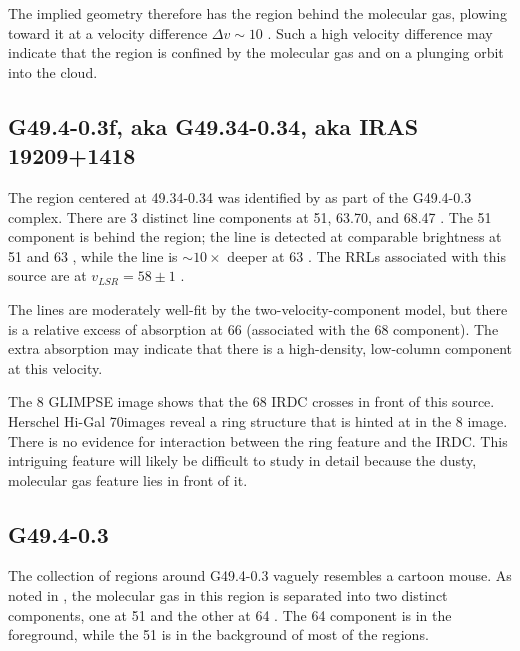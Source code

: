 The implied geometry therefore has the \hii region behind the molecular gas,
plowing toward it at a velocity difference $\Delta v \sim 10$ \kms.  Such a
high velocity difference may indicate that the \hii region is confined by the
molecular gas and on a plunging orbit into the cloud.

\subsection{G49.4-0.3f, aka G49.34-0.34, aka IRAS 19209+1418}
The \hii region centered at 49.34-0.34 was identified by \citet{Mehringer1994a}
as part of the G49.4-0.3 complex.  There are 3 distinct \formaldehyde line
components at 51, 63.70, and 68.47 \kms.  The 51 \kms component is behind the \hii
region; the \thirteenco line is detected at comparable brightness at 51 \kms
and 63 \kms, while the \formaldehyde \oneone line is $\sim10\times$ deeper at
63 \kms.  The RRLs associated with this source are at $v_{LSR}=58 \pm 1$ \kms.

The \formaldehyde lines are moderately well-fit by the two-velocity-component
model, but there is a relative excess of \twotwo absorption at 66 \kms
(associated with the 68 \kms component).  The extra absorption may indicate
that there is a high-density, low-column
component at this velocity.

The 8 \um GLIMPSE image shows that the 68 \kms IRDC crosses in front of this
source.  Herschel Hi-Gal 70\um images reveal a ring structure that is hinted at
in the 8 \um image.  There is no evidence for interaction between the ring
feature and the IRDC.  This intriguing feature will likely be difficult to
study in detail because the dusty, molecular gas feature lies in front of it.

\subsection{G49.4-0.3}
\label{sec:maus}
The collection of \hii regions around G49.4-0.3 vaguely resembles a cartoon
mouse.  As noted in \citet{Carpenter1998a}, the molecular gas in this region is
separated into two distinct components, one at 51 \kms and the other at 64
\kms.  The 64 \kms component is in the foreground, while the 51 \kms is in the
background of most of the \hii regions.  

